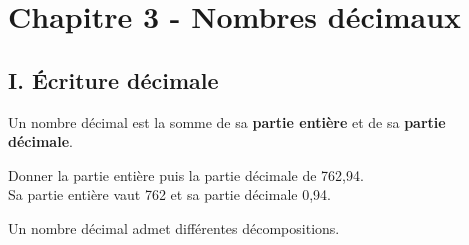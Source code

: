 
\section*{Chapitre 3 - Nombres décimaux}

\subsection*{I. Écriture décimale}


\begin{Définition}
Un nombre décimal est la somme de sa \textbf{partie entière} et de sa \textbf{partie décimale}.
\end{Définition}

\begin{Exemple}
Donner la partie entière puis la partie décimale de 762,94.\\
Sa partie entière vaut 762 et sa partie décimale 0,94.
\end{Exemple}


\begin{Propriété}
Un nombre décimal admet différentes décompositions.
\end{Propriété}

